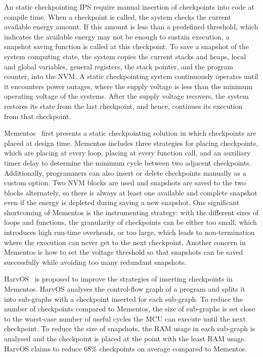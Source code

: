An static checkpointing IPS require manual insertion of checkpoints into code at compile time. 
When a checkpoint is called, the system checks the current available energy amount. 
If this amount is less than a predefined threshold, which indicates the available energy may not be enough to sustain execution, a snapshot saving function is called at this checkpoint. 
To save a snapshot of the system computing state, the system copies the current stacks and heaps, local and global variables, general registers, the stack pointer, and the program counter, into the NVM. 
A static checkpointing system continuously operates until it encounters power outages, where the supply voltage is less than the minimum operating voltage of the systems. 
After the supply voltage recovers, the system restores its state from the last checkpoint, and hence, continues its execution from that checkpoint. 

Mementos~\cite{ransford2012mementos} first presents a static checkpointing solution in which checkpoints are placed at design time. 
Mementos includes three strategies for placing checkpoints, which are placing at every loop, placing at every function call, and an auxiliary timer delay to determine the minimum cycle between two adjacent checkpoints. 
Additionally, programmers can also insert or delete checkpoints manually as a custom option. 
Two NVM blocks are used and snapshots are saved to the two blocks alternately, so there is always at least one available and complete snapshot even if the energy is depleted during saving a new snapshot. 
One significant shortcoming of Mementos is the instrumenting strategy: with the different sizes of loops and functions, the granularity of checkpoints can be either too small, which introduces high run-time overheads, or too large, which leads to non-termination where the execution can never get to the next checkpoint. 
Another concern in Mementos is how to set the voltage threshold so that snapshots can be saved successfully while avoiding too many redundant snapshots.

HarvOS~\cite{bhatti2017harvos} is proposed to improve the strategies of inserting checkpoints in Mementos. 
HarvOS analyses the control-flow graph of a program and splits it into sub-graphs with a checkpoint inserted for each sub-graph. 
To reduce the number of checkpoints compared to Mementos, the size of sub-graphs is set close to the worst-case number of useful cycles the MCU can execute until the next checkpoint. 
To reduce the size of snapshots, the RAM usage in each sub-graph is analysed and the checkpoint is placed at the point with the least RAM usage. HarvOS claims to reduce 68\% checkpoints on average compared to Mementos.

